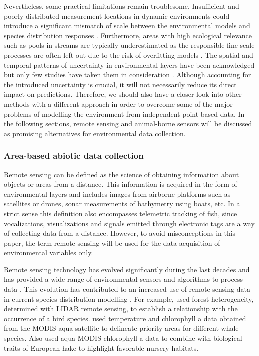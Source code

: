 \documentclass[12pt,authoryear]{elsarticle}
\begin{document}
Nevertheless, some practical limitations remain troublesome. Insufficient and poorly distributed measurement locations in dynamic environments could introduce a significant mismatch of scale between the environmental models and species distribution responses \citep{Fernandez2013}. Furthermore, areas with high ecological relevance such as pools in streams are typically underestimated as the responsible fine-scale processes are often left out due to the risk of overfitting models \citep{Harrison2007}. The spatial and temporal patterns of uncertainty in environmental layers have been acknowledged but only few studies have taken them in consideration \citep{Beale2012,Fernandez2013,Hayes2009}. Although accounting for the introduced uncertainty is crucial, it will not necessarily reduce its direct impact on predictions. Therefore, we should also have a closer look into other methods with a different approach in order to overcome some of the major problems of modelling the environment from independent point-based data. In the following sections, remote sensing and animal-borne sensors will be discussed as promising alternatives for environmental data collection.

\subsubsection{Area-based abiotic data collection}
\label{RS}

Remote sensing can be defined as the science of obtaining information about objects or areas from a distance. This information is acquired in the form of environmental layers and includes images from airborne platforms such as satellites or drones, sonar measurements of bathymetry using boats, etc. In a strict sense this definition also encompasses telemetric tracking of fish, since vocalizations, visualizations and signals emitted through electronic tags are a way of collecting data from a distance. However, to avoid misconceptions in this paper, the term remote sensing will be used for the data acquisition of environmental variables only.

Remote sensing technology has evolved significantly during the last decades and has provided a wide range of environmental sensors and algorithms to process data \citep{He2015}. This evolution has contributed to an increased use of remote sensing data in current species distribution modelling \citep{He2015,Beger2008}. For example, \citet{Goetz2010} used forest heterogeneity, determined with LIDAR remote sensing, to establish a relationship with the occurrence of a bird species. \citet{Gomez2017}  used temperature and chlorophyll a data obtained from the MODIS aqua satellite to delineate priority areas for different whale species. Also \citet{Druon2015} used aqua-MODIS chlorophyll a data to combine with biological traits of European hake to highlight favorable nursery habitats. 
\end{document}
